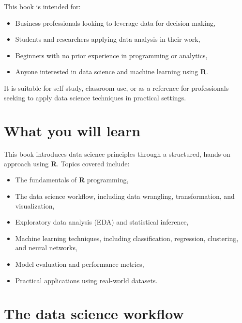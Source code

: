 \documentclass[
]{book}
\providecommand{\tightlist}{%
  \setlength{\itemsep}{0pt}\setlength{\parskip}{0pt}}
\theoremstyle{definition}
\theoremstyle{definition}
\theoremstyle{definition}
\theoremstyle{definition}
\theoremstyle{remark}
\begin{document}
This book is intended for:

\begin{itemize}
\tightlist
\item
  Business professionals looking to leverage data for decision-making,\\
\item
  Students and researchers applying data analysis in their work,\\
\item
  Beginners with no prior experience in programming or analytics,\\
\item
  Anyone interested in data science and machine learning using \textbf{R}.
\end{itemize}

It is suitable for self-study, classroom use, or as a reference for professionals seeking to apply data science techniques in practical settings.

\section*{What you will learn}\label{what-you-will-learn}

This book introduces data science principles through a structured, hands-on approach using \textbf{R}. Topics covered include:

\begin{itemize}
\tightlist
\item
  The fundamentals of \textbf{R} programming,\\
\item
  The data science workflow, including data wrangling, transformation, and visualization,\\
\item
  Exploratory data analysis (EDA) and statistical inference,\\
\item
  Machine learning techniques, including classification, regression, clustering, and neural networks,\\
\item
  Model evaluation and performance metrics,\\
\item
  Practical applications using real-world datasets.
\end{itemize}

\section*{The data science workflow}\label{the-data-science-workflow}
\end{document}

